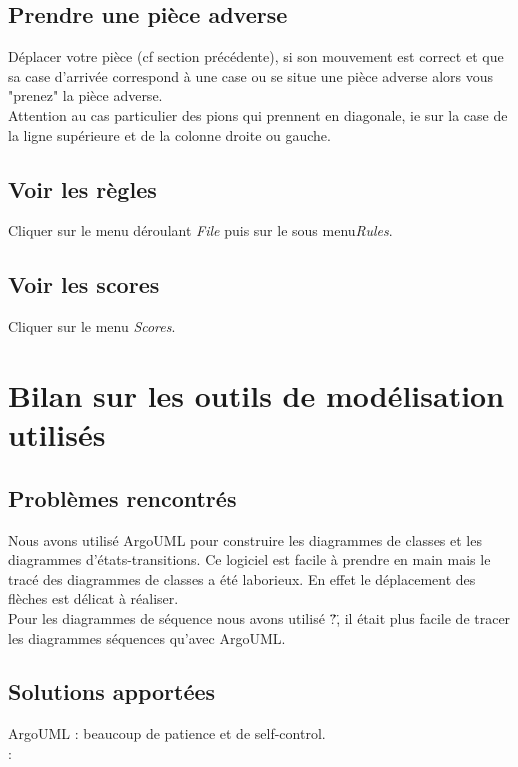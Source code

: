 \documentclass[12pt,a4paper]{report}
\begin{document}
\section*{Prendre une pièce adverse}
Déplacer votre pièce (cf section précédente), si son mouvement est correct et que sa case d'arrivée correspond à une case ou se situe une pièce adverse alors vous "prenez" la pièce adverse.
\\ Attention au cas particulier des pions qui prennent en diagonale, ie sur la case de la ligne supérieure et de la colonne droite ou gauche.
\section*{Voir les règles}
Cliquer sur le menu déroulant {\it File} puis sur le sous menu{\it Rules}.
\section*{Voir les scores}
Cliquer sur le menu {\it Scores}.

\maketitle
\chapter*{Bilan sur les outils de modélisation utilisés}

\section*{Problèmes rencontrés}
Nous avons utilisé ArgoUML pour construire les diagrammes de classes et les diagrammes d'états-transitions. Ce logiciel est facile à prendre en main mais le tracé des diagrammes de classes a été laborieux. En effet le déplacement des flèches est délicat à réaliser.
\\Pour les diagrammes de séquence nous avons utilisé \"?\", il était plus facile de tracer les diagrammes séquences qu'avec ArgoUML.


\section*{Solutions apportées}
ArgoUML : beaucoup de patience et de self-control.
\\:
\end{document}
